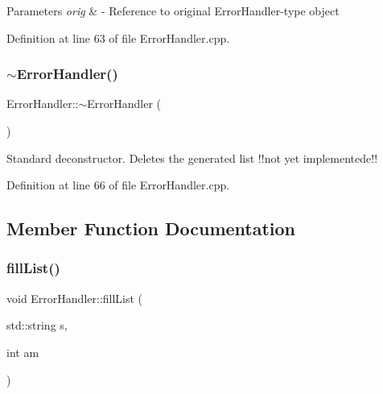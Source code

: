 \begin{DoxyParams}{Parameters}
{\em orig} & -\/ Reference to original Error\+Handler-\/type object \\
\hline
\end{DoxyParams}


Definition at line 63 of file Error\+Handler.\+cpp.

\mbox{\label{classErrorHandler_a73c7e690b864697e507aaeb537b3c3e5}} 
\subsubsection{\texorpdfstring{$\sim$ErrorHandler()}{~ErrorHandler()}}
{\footnotesize\ttfamily Error\+Handler\+::$\sim$\+Error\+Handler (\begin{DoxyParamCaption}{ }\end{DoxyParamCaption})\hspace{0.3cm}{\ttfamily [virtual]}}

Standard deconstructor. Deletes the generated list !!not yet implementede!! 

Definition at line 66 of file Error\+Handler.\+cpp.



\subsection{Member Function Documentation}
\mbox{\label{classErrorHandler_a3036b8ff4299ac0505b6b2ca6fab11a1}} 
\subsubsection{\texorpdfstring{fillList()}{fillList()}\hspace{0.1cm}{\footnotesize\ttfamily [1/2]}}
{\footnotesize\ttfamily void Error\+Handler\+::fill\+List (\begin{DoxyParamCaption}\item[{std\+::string}]{s,  }\item[{int}]{am }\end{DoxyParamCaption})\hspace{0.3cm}{\ttfamily [private]}}



